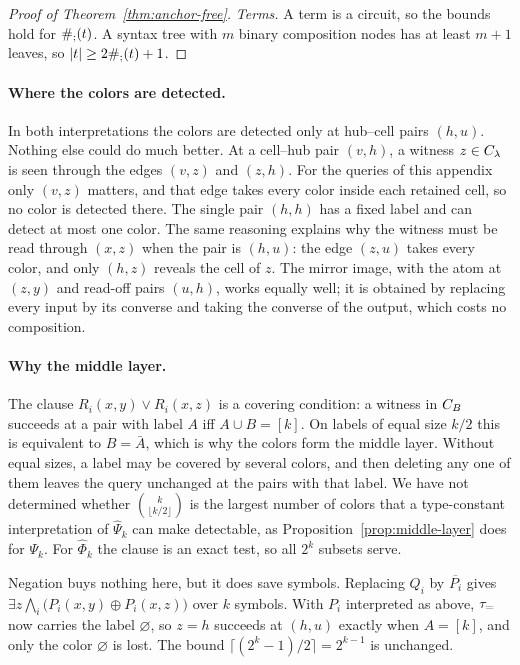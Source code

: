\begin{proof}[Proof of Theorem~\ref{thm:anchor-free}]
\emph{Terms.} A term is a circuit, so the bounds hold for $\#_{;}(t)$. A
syntax tree with $m$ binary composition nodes has at least $m+1$ leaves,
so $|t|\ge2\#_{;}(t)+1$.
\end{proof}
\paragraph{Where the colors are detected.}
In both interpretations the colors are detected only at hub--cell pairs
$(h,u)$. Nothing else could do much better. At a cell--hub pair $(v,h)$,
a witness $z\in C_{\lambda}$ is seen through the edges $(v,z)$ and
$(z,h)$. For the queries of this appendix only $(v,z)$ matters, and that
edge takes every color inside each retained cell, so no color is detected
there. The single pair $(h,h)$ has a fixed label and can detect at most
one color. The same reasoning explains why the witness must be read
through $(x,z)$ when the pair is $(h,u)$: the edge $(z,u)$ takes every
color, and only $(h,z)$ reveals the cell of $z$. The mirror image, with
the atom at $(z,y)$ and read-off pairs $(u,h)$, works equally well; it is
obtained by replacing every input by its converse and taking the converse
of the output, which costs no composition.

\paragraph{Why the middle layer.}
The clause $R_i(x,y)\lor R_i(x,z)$ is a covering condition: a witness in
$C_{B}$ succeeds at a pair with label $A$ iff $A\cup B=[k]$. On labels of
equal size $k/2$ this is equivalent to $B=\bar A$, which is why the colors
form the middle layer. Without equal sizes, a label may be covered by
several colors, and then deleting any one of them leaves the query
unchanged at the pairs with that label. We have not determined whether $\binom{k}{\lfloor k/2\rfloor}$ is the
largest number of colors that a type-constant interpretation of
$\widehat\Psi_k$ can make detectable, as Proposition~\ref{prop:middle-layer}
does for $\Psi_k$. For $\widehat\Phi_k$ the clause is an exact test, so all
$2^k$ subsets serve.

Negation buys nothing here, but it does save symbols. Replacing $Q_i$ by
$\overline{P_i}$ gives
$\exists z\bigwedge_i\bigl(P_i(x,y)\oplus P_i(x,z)\bigr)$ over $k$
symbols. With $P_i$ interpreted as above, $\tau_{=}$ now carries the label
$\varnothing$, so $z=h$ succeeds at $(h,u)$ exactly when $A=[k]$, and only
the color $\varnothing$ is lost. The bound
$\lceil(2^k-1)/2\rceil=2^{k-1}$ is unchanged.

